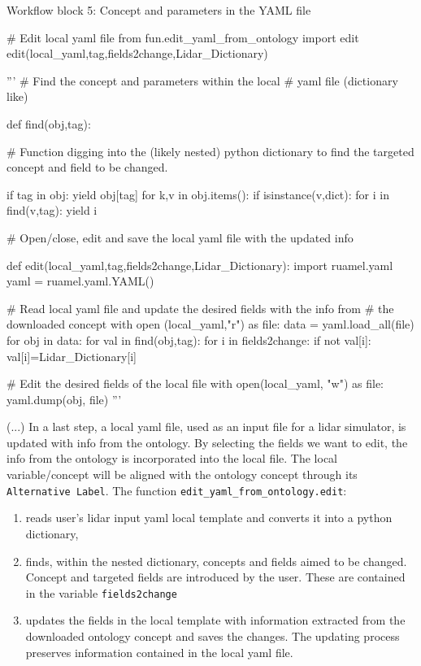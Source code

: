 \documentclass[remotesensing,article,submit,pdftex,moreauthors]{Definitions/mdpi}
\begin{document}
\begin{tcolorbox}
    Workflow block 5: Concept and parameters in the YAML file
    \begin{python}

# Edit local yaml file
from fun.edit_yaml_from_ontology import edit
edit(local_yaml,tag,fields2change,Lidar_Dictionary) 

'''
# Find the concept and parameters within the local
# yaml file (dictionary like) 

def find(obj,tag):
    
    # Function digging into the (likely nested) python dictionary to find the targeted concept and field to be changed.
    
    if tag in obj:
        yield obj[tag]
    for k,v in obj.items():       
        if isinstance(v,dict):
            for i in find(v,tag):
                yield i                

# Open/close, edit and save the local yaml file with the updated info     

def edit(local_yaml,tag,fields2change,Lidar_Dictionary):
    import ruamel.yaml
    yaml = ruamel.yaml.YAML()
    
    # Read local yaml file and update the desired fields with the info from 
    # the downloaded concept  
    with open (local_yaml,"r") as file:
        data = yaml.load_all(file)
        for obj in data:
            for val in find(obj,tag):
                for i in fields2change:
                    if not val[i]:
                        val[i]=Lidar_Dictionary[i]
    
    # Edit the desired fields of the local file
    with open(local_yaml, "w") as file:
        yaml.dump(obj, file)
'''    
\end{python}
\end{tcolorbox}


(...) In a last step, a local yaml file, used as an input file for a lidar simulator, is updated with info from the ontology. By selecting the fields we want to edit, the info from the ontology is incorporated into the local file. The local variable/concept will be aligned with the ontology concept through its \texttt{Alternative Label}. The function  \texttt{edit\_yaml\_from\_ontology.edit}:

\begin{enumerate}
    \item reads user's lidar input yaml local template and converts it into a python dictionary,
    \item finds, within the nested dictionary, concepts and fields aimed to be changed. Concept and targeted fields are introduced by the user. These are contained in the variable \texttt{fields2change}
    \item updates the fields in the local template with information extracted from the downloaded ontology concept and saves the changes. The updating process preserves information contained in the local yaml file. 
    
\end{enumerate} 
\end{document}
